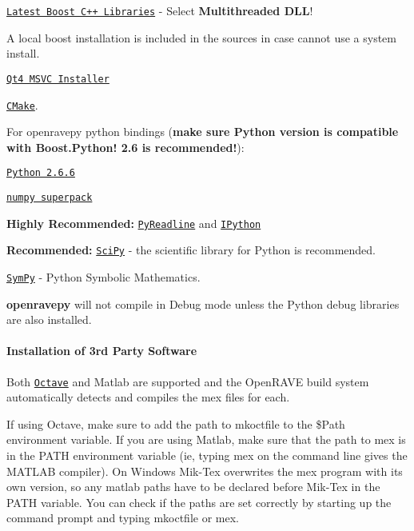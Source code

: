 \begin{DoxyItemize}
\item \href{http://www.boostpro.com/download/}{\tt Latest Boost C++ Libraries} -\/ Select {\bfseries Multithreaded DLL}!
\begin{DoxyItemize}
\item A local boost installation is included in the sources in case cannot use a system install.
\end{DoxyItemize}
\item \href{http://code.google.com/p/qt-msvc-installer/downloads/list}{\tt Qt4 MSVC Installer}
\item \href{http://www.cmake.org/cmake/resources/software.html}{\tt CMake}.
\item For openravepy python bindings ({\bfseries make sure Python version is compatible with Boost.Python! 2.6 is recommended!}):
\begin{DoxyItemize}
\item \href{http://python.org/download/releases/2.6.6}{\tt Python 2.6.6}
\item \href{http://sourceforge.net/projects/numpy/files}{\tt numpy superpack}
\item {\bfseries Highly Recommended:} \href{http://ipython.scipy.org/moin/PyReadline/Intro}{\tt PyReadline} and \href{http://ipython.scipy.org/moin/Download}{\tt IPython}
\item {\bfseries Recommended:} \href{http://sourceforge.net/projects/scipy/files/}{\tt SciPy} -\/ the scientific library for Python is recommended.
\item \href{http://code.google.com/p/sympy/downloads/list}{\tt SymPy} -\/ Python Symbolic Mathematics.
\item {\bfseries openravepy} will not compile in Debug mode unless the Python debug libraries are also installed.
\end{DoxyItemize}
\end{DoxyItemize}\hypertarget{installation__windows_iwin_octavematlab}{}\paragraph{Installation of 3rd Party Software}\label{installation__windows_iwin_octavematlab}
Both \href{http://www.gnu.org/software/octave/}{\tt Octave} and Matlab are supported and the OpenRAVE build system automatically detects and compiles the mex files for each.


\begin{DoxyItemize}
\item If using Octave, make sure to add the path to {\ttfamily mkoctfile} to the \$Path environment variable. If you are using Matlab, make sure that the path to {\ttfamily mex} is in the PATH environment variable (ie, typing {\ttfamily mex} on the command line gives the MATLAB compiler). On Windows Mik-\/Tex overwrites the {\ttfamily mex} program with its own version, so any matlab paths have to be declared before Mik-\/Tex in the PATH variable. You can check if the paths are set correctly by starting up the command prompt and typing {\ttfamily mkoctfile} or {\ttfamily mex}.
\end{DoxyItemize}

